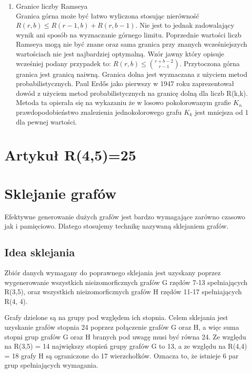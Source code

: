 \documentclass[11pt]{article}
\begin{document}
\begin{enumerate}
\item Granice liczby Ramseya \hfill \\

Granica górna może być łatwo wyliczona stosując nierówność $R(r,b) \le R(r-1,b)+R(r,b-1)$. Nie jest to jednak zadowalający wynik ani sposób na wyznaczanie górnego limitu. Poprzednie wartości liczb Ramseya mogą nie być znane oraz sama granica przy znanych wcześniejszych wartościach nie jest najbardziej optymalną. Wzór jawny który opisuje wcześniej podany przypadek to: $R(r,b) \le {r+b-2\choose r-1}$. Przytoczona górna granica jest granicą naiwną. Granica dolna jest wyznaczana z użyciem metod probabilistycznych. Paul Erdős jako pierwszy w 1947 roku zaprezentował dowód z użyciem metod probabilistycznych na granicę dolną dla liczb R(k,k). Metoda ta opierała się na wykazaniu że w losowo pokolorowanym grafie $\mathit{K}_{n}$ prawdopodobieństwo znalezienia jednokolorowego grafu $\mathit{K}_{k}$ jest mniejsza od 1 dla pewnej wartości.

\end{enumerate}

\section{Artykuł R(4,5)=25}

\section{Sklejanie grafów}
Efektywne generowanie dużych grafów jest bardzo wymagające zarówno czasowo jak i pamięciowo. Dlatego stosujemy technikę nazywaną sklejaniem grafów. 

\subsection{Idea sklejania}
Zbiór danych wymagany do poprawnego sklejania jest uzyskany poprzez wygenerowanie wszystkich nieizomorficznych grafów G rzędów 7-13 spełniających R(3,5), oraz wszystkich nieizomorficznych grafów H rzędów 11-17 spełniających R(4, 4).

Grafy dzielone są na grupy pod względem ich stopnia. Celem sklejania jest uzyskanie grafów stopnia 24 poprzez połączenie grafów G oraz H, a więc suma stopni grup grafów G oraz H branych pod uwagę musi być równa 24. Ze względu na R(3,5) = 14 największy stopień grupy grafów G to 13, a ze względu na R(4,4) = 18 grafy H są ograniczone do 17 wierzchołków. Oznacza to, że istnieje 6 par grup spełniających wymagania. 
\end{document}
